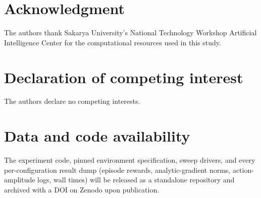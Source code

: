 \documentclass[preprint,12pt,3p]{elsarticle}
\begin{document}









\section*{Acknowledgment}
The authors thank Sakarya University's National Technology Workshop
Artificial Intelligence Center for the computational resources used in this
study.

\section*{Declaration of competing interest}
The authors declare no competing interests.

\section*{Data and code availability}
The experiment code, pinned environment specification, sweep drivers, and
every per-configuration result dump (episode rewards, analytic-gradient
norms, action-amplitude logs, wall times) will be released as a standalone
repository and archived with a DOI on Zenodo upon publication.



\end{document}
